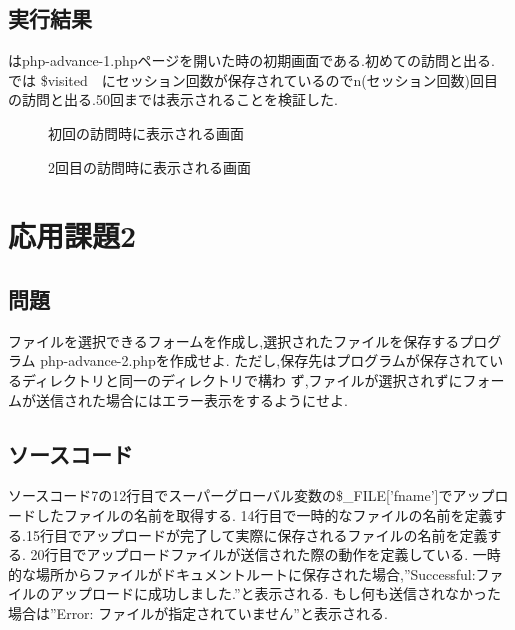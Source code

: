 \documentclass[a4j,10pt]{jsarticle}
\begin{document}

\newpage

\subsection{実行結果}


はphp-advance-1.phpページを開いた時の初期画面である.初めての訪問と出る.
では \$visited　にセッション回数が保存されているのでn(セッション回数)回目の訪問と出る.50回までは表示されることを検証した.
\begin{figure}[H]
  \centering
  \caption{初回の訪問時に表示される画面}
\label{fig:ad1}
\end{figure}

\begin{figure}[H]
  \centering
  \caption{2回目の訪問時に表示される画面}
\label{fig:ad2}
\end{figure}



\section{応用課題2}

\subsection{問題}


  ファイルを選択できるフォームを作成し,選択されたファイルを保存するプログラム
php-advance-2.phpを作成せよ.
ただし,保存先はプログラムが保存されているディレクトリと同一のディレクトリで構わ
ず,ファイルが選択されずにフォームが送信された場合にはエラー表示をするようにせよ.

\subsection{ソースコード}

  ソースコード7の12行目でスーパーグローバル変数の\$\_FILE['fname']でアップロードしたファイルの名前を取得する.
  14行目で一時的なファイルの名前を定義する.15行目でアップロードが完了して実際に保存されるファイルの名前を定義する.
  20行目でアップロードファイルが送信された際の動作を定義している.
  一時的な場所からファイルがドキュメントルートに保存された場合,”Successful:ファイルのアップロードに成功しました.”と表示される.
  もし何も送信されなかった場合は”Error: ファイルが指定されていません”と表示される.
\end{document}
